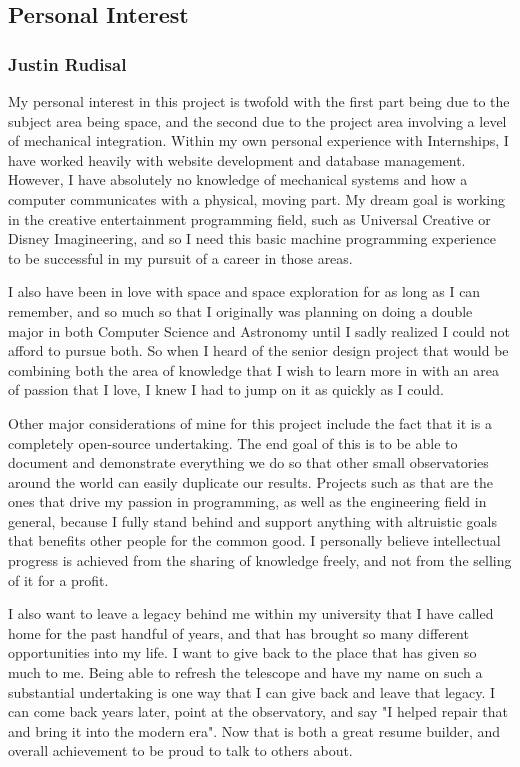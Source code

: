 \documentclass[12pt]{report}
\begin{document}
\subsection*{Personal Interest}

\subsubsection*{Justin Rudisal}

My personal interest in this project is twofold with the first part being due to the subject area being space, and the second due to the project area involving a level of mechanical integration. Within my own personal experience with Internships, I have worked heavily with website development and database management. However, I have absolutely no knowledge of mechanical systems and how a computer communicates with a physical, moving part. My dream goal is working in the creative entertainment programming field, such as Universal Creative or Disney Imagineering, and so I need this basic machine programming experience to be successful in my pursuit of a career in those areas.

I also have been in love with space and space exploration for as long as I can remember, and so much so that I originally was planning on doing a double major in both Computer Science and Astronomy until I sadly realized I could not afford to pursue both. So when I heard of the senior design project that would be combining both the area of knowledge that I wish to learn more in with an area of passion that I love, I knew I had to jump on it as quickly as I could.

Other major considerations of mine for this project include the fact that it is a completely open-source undertaking. The end goal of this is to be able to document and demonstrate everything we do so that other small observatories around the world can easily duplicate our results. Projects such as that are the ones that drive my passion in programming, as well as the engineering field in general, because I fully stand behind and support anything with altruistic goals that benefits other people for the common good. I personally believe intellectual progress is achieved from the sharing of knowledge freely, and not from the selling of it for a profit.

I also want to leave a legacy behind me within my university that I have called home for the past handful of years, and that has brought so many different opportunities into my life. I want to give back to the place that has given so much to me. Being able to refresh the telescope and have my name on such a substantial undertaking is one way that I can give back and leave that legacy. I can come back years later, point at the observatory, and say "I helped repair that and bring it into the modern era". Now that is both a great resume builder, and overall achievement to be proud to talk to others about.
\end{document}
